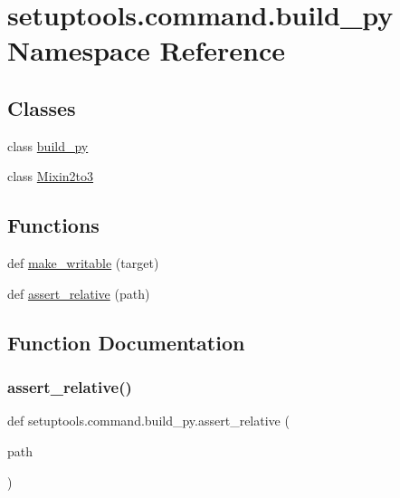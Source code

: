 \hypertarget{namespacesetuptools_1_1command_1_1build__py}{}\section{setuptools.\+command.\+build\+\_\+py Namespace Reference}
\label{namespacesetuptools_1_1command_1_1build__py}
\subsection*{Classes}
\begin{DoxyCompactItemize}
\item 
class \hyperlink{classsetuptools_1_1command_1_1build__py_1_1build__py}{build\+\_\+py}
\item 
class \hyperlink{classsetuptools_1_1command_1_1build__py_1_1Mixin2to3}{Mixin2to3}
\end{DoxyCompactItemize}
\subsection*{Functions}
\begin{DoxyCompactItemize}
\item 
def \hyperlink{namespacesetuptools_1_1command_1_1build__py_accf5f5af9c6f772652de58810515ae77}{make\+\_\+writable} (target)
\item 
def \hyperlink{namespacesetuptools_1_1command_1_1build__py_a1c5a9e809e618a17fb86cec7fcbdc25b}{assert\+\_\+relative} (path)
\end{DoxyCompactItemize}


\subsection{Function Documentation}
\mbox{\label{namespacesetuptools_1_1command_1_1build__py_a1c5a9e809e618a17fb86cec7fcbdc25b}} 
\subsubsection{\texorpdfstring{assert\+\_\+relative()}{assert\_relative()}}
{\footnotesize\ttfamily def setuptools.\+command.\+build\+\_\+py.\+assert\+\_\+relative (\begin{DoxyParamCaption}\item[{}]{path }\end{DoxyParamCaption})}

